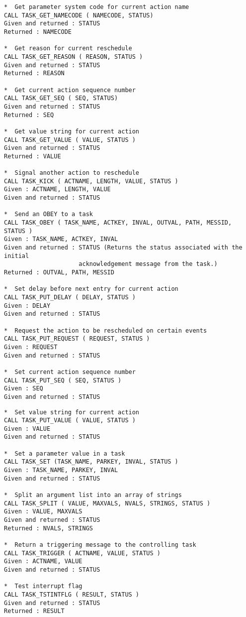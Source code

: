 \begin{verbatim}
*  Get parameter system code for current action name
CALL TASK_GET_NAMECODE ( NAMECODE, STATUS)
Given and returned : STATUS
Returned : NAMECODE

*  Get reason for current reschedule
CALL TASK_GET_REASON ( REASON, STATUS )
Given and returned : STATUS
Returned : REASON

*  Get current action sequence number
CALL TASK_GET_SEQ ( SEQ, STATUS)
Given and returned : STATUS
Returned : SEQ

*  Get value string for current action
CALL TASK_GET_VALUE ( VALUE, STATUS )
Given and returned : STATUS
Returned : VALUE

*  Signal another action to reschedule
CALL TASK_KICK ( ACTNAME, LENGTH, VALUE, STATUS )
Given : ACTNAME, LENGTH, VALUE
Given and returned : STATUS

*  Send an OBEY to a task
CALL TASK_OBEY ( TASK_NAME, ACTKEY, INVAL, OUTVAL, PATH, MESSID, STATUS )
Given : TASK_NAME, ACTKEY, INVAL
Given and returned : STATUS (Returns the status associated with the initial
                     acknowledgement message from the task.)
Returned : OUTVAL, PATH, MESSID

*  Set delay before next entry for current action
CALL TASK_PUT_DELAY ( DELAY, STATUS )
Given : DELAY
Given and returned : STATUS

*  Request the action to be rescheduled on certain events
CALL TASK_PUT_REQUEST ( REQUEST, STATUS )
Given : REQUEST
Given and returned : STATUS

*  Set current action sequence number
CALL TASK_PUT_SEQ ( SEQ, STATUS )
Given : SEQ
Given and returned : STATUS
\end{verbatim}
\newpage
\begin{verbatim}
*  Set value string for current action
CALL TASK_PUT_VALUE ( VALUE, STATUS )
Given : VALUE
Given and returned : STATUS

*  Set a parameter value in a task
CALL TASK_SET (TASK_NAME, PARKEY, INVAL, STATUS )
Given : TASK_NAME, PARKEY, INVAL
Given and returned : STATUS

*  Split an argument list into an array of strings
CALL TASK_SPLIT ( VALUE, MAXVALS, NVALS, STRINGS, STATUS )
Given : VALUE, MAXVALS
Given and returned : STATUS
Returned : NVALS, STRINGS

*  Return a triggering message to the controlling task
CALL TASK_TRIGGER ( ACTNAME, VALUE, STATUS )
Given : ACTNAME, VALUE
Given and returned : STATUS

*  Test interrupt flag
CALL TASK_TSTINTFLG ( RESULT, STATUS )
Given and returned : STATUS
Returned : RESULT
\end{verbatim}

